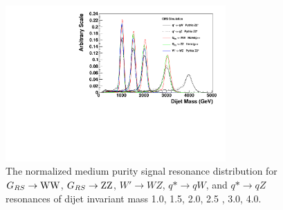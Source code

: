 
\begin{figure}[htb]
\begin{center}
\includegraphics[width=0.75\textwidth]{figs/signal-acc-eff/resonance-shape-medium.pdf}
\end{center}
\caption{The normalized medium purity signal resonance distribution for  $G_{RS}\to {\mathrm{W}}{\mathrm{W}}$, $G_{RS}\to {\mathrm{Z}}{\mathrm{Z}}$, $W' \to WZ$, $q*\to qW$, and $q*\to qZ$ resonances of dijet invariant mass 1.0\TeVcc, 1.5\TeVcc, 2.0\TeVcc, 2.5 \TeVcc,  3.0\TeVcc, 4.0\TeVcc.
}
\label{fig:mediumsignalShapes}
\end{figure}


